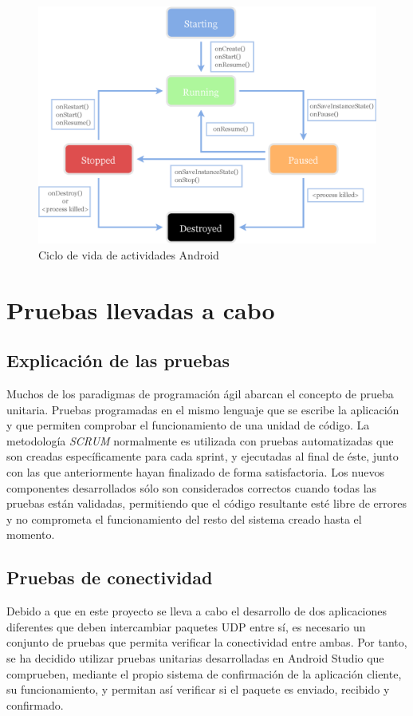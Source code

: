 \documentclass[12pt]{article}
\begin{document}
        \begin{figure}[h!]
            \centering
                \includegraphics[scale=0.7]{android_lifecycle.eps}
                \caption{Ciclo de vida de actividades Android}
                \label{fig:android_lifecycle}
        \end{figure}
\section{Pruebas llevadas a cabo}
    \subsection{Explicación de las pruebas}
    Muchos de los paradigmas de programación ágil abarcan el concepto de prueba unitaria. Pruebas programadas en el mismo lenguaje que se escribe la aplicación y que permiten comprobar el funcionamiento de una unidad de código. La metodología \textit{SCRUM} normalmente es utilizada con pruebas automatizadas que son creadas específicamente para cada sprint, y ejecutadas al final de éste, junto con las que anteriormente hayan finalizado de forma satisfactoria. Los nuevos componentes desarrollados sólo son considerados correctos cuando todas las pruebas están validadas, permitiendo que el código resultante esté libre de errores y no comprometa el funcionamiento del resto del sistema creado hasta el momento. 

    \subsection{Pruebas de conectividad}
    Debido a que en este proyecto se lleva a cabo el desarrollo de dos aplicaciones diferentes que deben intercambiar paquetes UDP entre sí, es necesario un conjunto de pruebas que permita verificar la conectividad entre ambas. Por tanto, se ha decidido utilizar pruebas unitarias desarrolladas en Android Studio que comprueben, mediante el propio sistema de confirmación de la aplicación cliente, su funcionamiento, y permitan así verificar si el paquete es enviado, recibido y confirmado.
\end{document}
